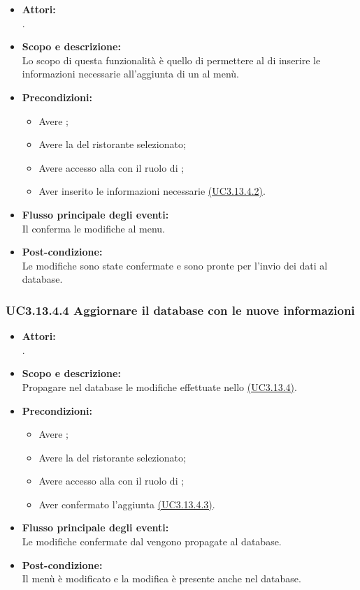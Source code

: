 \begin{itemize}
	\item \textbf{Attori:}
	\\.
	\item \textbf{Scopo e descrizione:} 
	\\Lo scopo di questa funzionalità è quello di permettere al  di inserire le informazioni necessarie all'aggiunta di un  al menù.
	\item \textbf{Precondizioni:}
	\begin{itemize}
		\item Avere ;
		\item Avere la  del ristorante selezionato;
		\item Avere accesso alla  con il ruolo di ;
		\item Aver inserito le informazioni necessarie \hyperref[UC3.13.4.2]{(UC3.13.4.2)}.
	\end{itemize}
	\item \textbf{Flusso principale degli eventi:}
	\\Il {} conferma le modifiche al menu.
	\item \textbf{Post-condizione:}
	\\Le modifiche sono state confermate e sono pronte per l'invio dei dati al database.
\end{itemize}

\subsubsection{UC3.13.4.4 Aggiornare il database con le nuove informazioni} \label{UC3.13.4.4}

\begin{itemize}
	\item \textbf{Attori:}
	\\.
	\item \textbf{Scopo e descrizione:} 
	\\Propagare nel database le modifiche effettuate nello \hyperref[UC3.13.4]{(UC3.13.4)}.
	\item \textbf{Precondizioni:}
	\begin{itemize}
		\item Avere ;
		\item Avere la  del ristorante selezionato;
		\item Avere accesso alla  con il ruolo di ;
		\item Aver confermato l'aggiunta \hyperref[UC3.13.4.3]{(UC3.13.4.3)}.
	\end{itemize}
	\item \textbf{Flusso principale degli eventi:}
	\\Le modifiche confermate dal  vengono propagate al database.
	\item \textbf{Post-condizione:}
	\\Il menù è modificato e la modifica è presente anche nel database.
\end{itemize}

